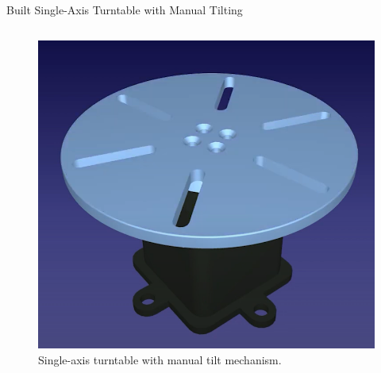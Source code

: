 \documentclass[aspectratio=169,xcolor=dvipsnames]{beamer}
\begin{document}
\begin{frame}{Built Single-Axis Turntable with Manual Tilting}
\begin{columns}[T]
  \begin{column}{0.4\textwidth}
    \begin{figure}
      \centering
      \includegraphics[width=\linewidth]{logos/Turntable.png}
      \caption{Single-axis turntable with manual tilt mechanism.}
      \label{fig:turntable_setup}
    \end{figure}
  \end{column}
\end{columns}
\end{frame}
\end{document}
